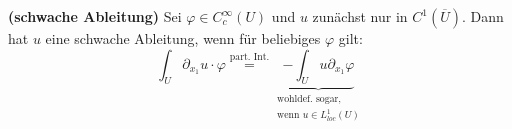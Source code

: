 \begin{definition}\textbf{(schwache Ableitung)}\enter
	Sei $\varphi\in C^\infty_c(U)$ und $u$ zunächst nur in $C^1(\overline{U})$. Dann hat $u$ eine schwache Ableitung, wenn für beliebiges $\varphi$ gilt:
	\[\int_U\partial_{x_1}u\cdot \varphi \stackrel{\text{part. Int.}}{=}
	\underbrace{-\int_U u\partial_{x_1}\varphi}_{\substack{\text{wohldef. sogar,}\\\text{wenn } u\in L^1_{loc}(U)}}\]
\end{definition}
